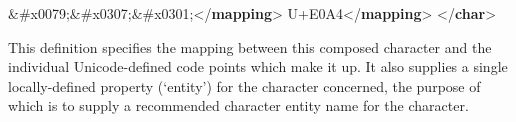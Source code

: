 \begin{shaded}
\mbox{}\newline 
{}\&\#x0079;\&\#x0307;\&\#x0301;{</\textbf{mapping}>}\mbox{}\newline 
{}U+E0A4{</\textbf{mapping}>}\mbox{}\newline 
{</\textbf{char}>}\end{shaded}\egroup\par \noindent  This definition specifies the mapping between this composed character and the individual Unicode-defined code points which make it up. It also supplies a single locally-defined property (‘entity’) for the character concerned, the purpose of which is to supply a recommended character entity name for the character.\par
